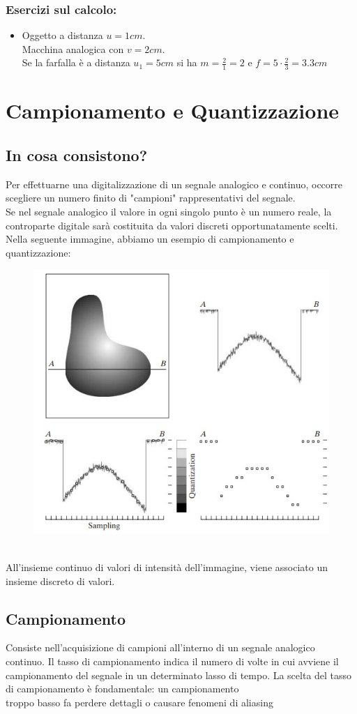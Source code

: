 \documentclass{report}
\begin{document}
	\subsection{Esercizi sul calcolo:}
	\begin{itemize}
		\item 
		      
		      Oggetto a distanza $u=1cm$.\\
		      Macchina analogica con $v=2cm$.\\
		      Se la farfalla è a distanza $u_1=5cm$ si ha $m=\frac{2}{1}=2$ e $f=5 \cdot \frac{2}{3}=3.3cm$
	\end{itemize}
	\newpage
	\chapter{Campionamento e Quantizzazione}
	\section{In cosa consistono?}
	Per effettuarne una digitalizzazione di un segnale analogico e continuo, occorre scegliere un numero finito di "campioni" rappresentativi del segnale.\\
	Se nel segnale analogico il valore in ogni singolo punto è un numero reale, la controparte digitale sarà costituita da valori discreti opportunatamente scelti.
	Nella seguente immagine, abbiamo un esempio di campionamento e quantizzazione:
	\begin{figure}[htp]
		\centering
		\includegraphics[width=0.6\linewidth]{Basic-Concepts-in-Sampling-and-Quantization.jpeg}
	\end{figure}\\
	All'insieme continuo di valori di intensità dell'immagine, viene associato un insieme discreto di valori.
	\section{Campionamento}
	Consiste nell'acquisizione di campioni all'interno di un segnale analogico continuo. Il tasso di campionamento indica il numero di volte in cui avviene il campionamento del segnale in un determinato lasso di tempo.
	La scelta del tasso di campionamento è fondamentale:
	un campionamento \\troppo basso fa perdere dettagli o causare fenomeni di aliasing
\end{document}
